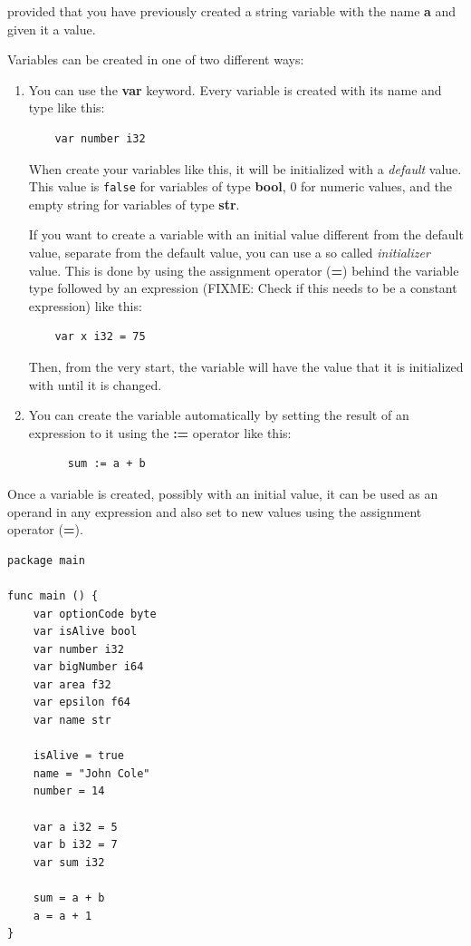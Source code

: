 \documentclass[11pt,fleqn,openany]{book} %
\begin{document}
provided that you have previously created a string variable with the name \textbf{a} and given it a value.

Variables can be created in one of two different ways:

\begin{enumerate}
    \item You can use the \textbf{var} keyword. Every variable is created with its name and type like this:
    \begin{lstlisting}
    var number i32
    \end{lstlisting}
    When create your variables like this, it will be initialized with a \textit{default} value.  This value is \texttt{false} for variables of type \textbf{bool}, 0 for numeric values, and the empty string for variables of type \textbf{str}.
    
    If you want to create a variable with an initial value different from the default value, separate from the default value, you can use a so called \emph{initializer} value. This is done by using the assignment operator (\textbf{=}) behind the variable type followed by an expression (FIXME: Check if this needs to be a constant expression) like this:
    
    \begin{lstlisting}
    var x i32 = 75
    \end{lstlisting}
    
    Then, from the very start, the variable will have the value that it is initialized with until it is changed.

    \item You can create the variable automatically by setting the result of an expression to it using the \textbf{:=} operator like this:
    \begin{lstlisting}
      sum := a + b
    \end{lstlisting}
\end{enumerate}

Once a variable is created, possibly with an initial value, it can be used as an operand in any expression and also set to new values using the assignment operator (\textbf{=}).

\begin{lstlisting}[caption={Variable declaration and usage},captionpos=b,label={listing:variable-usage}]
package main

func main () {
	var optionCode byte
	var isAlive bool
	var number i32
	var bigNumber i64
	var area f32
	var epsilon f64
	var name str
    
    isAlive = true
    name = "John Cole"
    number = 14

    var a i32 = 5
    var b i32 = 7
    var sum i32

    sum = a + b
    a = a + 1
}
\end{lstlisting}
\end{document}
